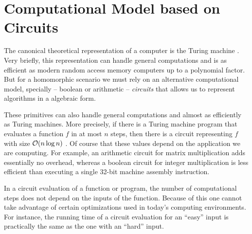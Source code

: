 \chapter{Computational Model based on Circuits}\label{chap:circs}
The canonical theoretical representation of a computer is the Turing
machine \cite{Turing01011937}.
Very briefly, this representation can handle general computations and is as
efficient as modern random access memory computers up to a polynomial factor.
But for a homomorphic scenario we must rely on an alternative computational
model, specially -- boolean or arithmetic -- \emph{circuits} that allows us to
represent algorithms in a algebraic form.

These primitives can also handle general computations and almost as efficiently
as Turing machines. More precisely, if there is a Turing machine program that
evaluates a function $f$ in at most $n$ steps, then there is a circuit
representing $f$ with size $\mathcal{O}(n \log n)$ \cite{Pippenger:1979:RCM}. Of
course that these values depend on the application we are computing. For
example, an arithmetic circuit for matrix multiplication adds essentially no
overhead, whereas a boolean circuit for integer multiplication is less
efficient than executing a single 32-bit machine assembly instruction.

In a circuit evaluation of a function or program, the number of computational
steps does not depend on the inputs of the function. Because of this one cannot
take advantage of certain optimizations used in today's computing environments.
For instance, the running time of a circuit evaluation for an ``easy'' input is
practically the same as the one with an ``hard'' input.

